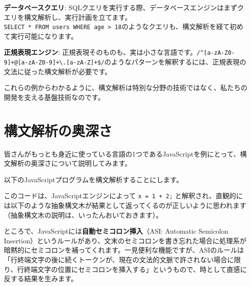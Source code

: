 \textbf{データベースクエリ}:
SQLクエリを実行する際、データベースエンジンはまずクエリを構文解析し、実行計画を立てます。\texttt{SELECT\ *\ FROM\ users\ WHERE\ age\ \textgreater{}\ 18}のようなクエリも、構文解析を経て初めて実行可能になります。

\textbf{正規表現エンジン}:
正規表現そのものも、実は小さな言語です。\texttt{/\^{}{[}a-zA-Z0-9{]}+@{[}a-zA-Z0-9{]}+\textbackslash{}.{[}a-zA-Z{]}+\$/}のようなパターンを解釈するには、正規表現の文法に従った構文解析が必要です。

これらの例からわかるように、構文解析は特別な分野の技術ではなく、私たちの開発を支える基盤技術なのです。

\hypertarget{chapter1-ux69cbux6587ux89e3ux6790ux306eux5965ux6df1ux3055}{%
\section{構文解析の奥深さ}\label{chapter1-ux69cbux6587ux89e3ux6790ux306eux5965ux6df1ux3055}}

皆さんがもっとも身近に使っている言語の1つであるJavaScriptを例にとって、構文解析の奥深さについて説明してみます。

以下のJavaScriptプログラムを構文解析することにします。

\begin{Shaded}
\begin{Highlighting}[]
\OperatorTok{=}  \OperatorTok{+}
\end{Highlighting}
\end{Shaded}

このコードは、JavaScriptエンジンによって \texttt{x\ =\ 1\ +\ 2;}
と解釈され、直観的には以下のような抽象構文木が結果として返ってくるのが正しいように思われます（抽象構文木の説明は、いったんおいておきます）。

\begin{center}
\end{center}

ところで、JavaScriptには\textbf{自動セミコロン挿入}（ASI: Automatic
Semicolon
Insertion）というルールがあり、文末のセミコロンを書き忘れた場合に処理系が暗黙的にセミコロンを補ってくれます。一見便利な機能ですが、ASIのルールは「行終端文字の後に続くトークンが、現在の文法的文脈で許されない場合に限り、行終端文字の位置にセミコロンを挿入する」というもので、時として直感に反する結果を生みます。


